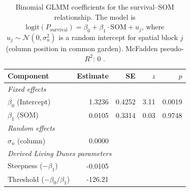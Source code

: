 \begin{table}[htbp]
\centering
\caption{Binomial GLMM coefficients for the survival--SOM relationship. The model is $\mathrm{logit}(P_{\mathrm{survival}}) = \beta_0 + \beta_1 \cdot \mathrm{SOM} + u_j$, where $u_j \sim \mathcal{N}(0, \sigma^2_u)$ is a random intercept for spatial block $j$ (column position in common garden). McFadden pseudo-$R^2$:  0 .}
\label{tab:mortality_coefficients}
\begin{tabular}{lrrrr}
\toprule
Component & Estimate & SE & $z$ & $p$ \\
\midrule
\multicolumn{5}{l}{\textit{Fixed effects}} \\
$\beta_0$ (Intercept) & 1.3236 & 0.4252 & 3.11 & 0.0019 \\
$\beta_1$ (SOM) & 0.0105 & 0.3314 & 0.03 & 0.9748 \\
\midrule
\multicolumn{5}{l}{\textit{Random effects}} \\
$\sigma_u$ (column) & 0.0000 & & & \\
\midrule
\multicolumn{5}{l}{\textit{Derived Living Dunes parameters}} \\
Steepness ($-\beta_1$) & -0.0105 & & & \\
Threshold ($-\beta_0/\beta_1$) & -126.21 & & & \\
\bottomrule
\end{tabular}
\end{table}

